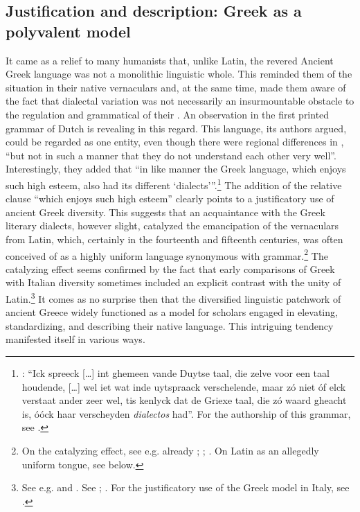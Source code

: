 \subsection{Justification and description: Greek as a polyvalent model}\label{sec:8.1.2}

It came as a relief to many humanists that, unlike Latin, the revered Ancient Greek language was not a monolithic linguistic whole. This reminded them of the situation in their native vernaculars and, at the same time, made them aware of the fact that dialectal variation was not necessarily an insurmountable obstacle to the regulation and grammatical  of their . An observation in the first printed grammar of Dutch is revealing in this regard. This language, its authors argued, could be regarded as one entity, even though there were regional differences in , “but not in such a manner that they do not understand each other very well”. Interestingly, they added that “in like manner the Greek language, which enjoys such high esteem, also had its different ‘dialects’”.\footnote{\citet[110]{[spieghel]1584}: “Ick spreeck […] int ghemeen vande Duytse taal, die zelve voor een taal houdende, […] wel iet wat inde uytspraack verschelende, maar zó niet óf elck verstaat ander zeer wel, tis kenlyck dat de Griexe taal, die zó waard gheacht is, óóck haar verscheyden \textit{dialectos} had”. For the authorship of this grammar, see \citet{Peeters1982}.} The addition of the relative clause “which enjoys such high esteem” clearly points to a justificatory use of ancient Greek diversity. This suggests that an acquaintance with the Greek literary dialects, however slight, catalyzed the emancipation of the vernaculars from Latin, which, certainly in the fourteenth and fifteenth centuries, was often conceived of as a highly uniform language synonymous with grammar.\footnote{On the catalyzing effect, see e.g. already \citet[688]{Bonfante1953}; \citet[9]{Trapp1990}; \citet[67]{Rhodes2015}. On Latin as an allegedly uniform tongue, see  below.} The catalyzing effect seems confirmed by the fact that early comparisons of Greek with Italian diversity sometimes included an explicit contrast with the unity of Latin.\footnote{See e.g. \citet[\textsc{ii}.41]{Landino1974} and \citet[*.ii\textsc{\textsuperscript{v}}]{Manutius1496Aldus}. See \citet[172--173]{Alinei1984}; \citet[209--210, 215]{Trovato1984}. For the justificatory use of the Greek model in Italy, see \citet[46, 50]{Tavoni1998}.} It comes as no surprise then that the diversified linguistic patchwork of ancient Greece widely functioned as a model for scholars engaged in elevating, standardizing, and describing their native  language. This intriguing tendency manifested itself in various ways.

